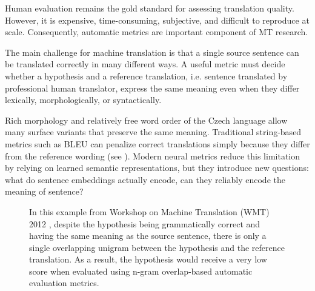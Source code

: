 \documentclass[12pt,a4paper]{report}
\newcommand{\bleu}{\textsc{BLEU}\xspace}
\begin{document}
Human evaluation remains the gold standard for assessing translation quality. However,
it is expensive, time-consuming, subjective, and difficult to reproduce at scale.
Consequently, automatic metrics are important component of MT research. 

The main challenge for machine translation is that a single source sentence can be 
translated correctly in many different ways. A useful metric must decide whether a 
hypothesis and a reference translation, i.e. sentence translated by professional human
translator, express the same meaning even when they differ lexically, morphologically, 
or syntactically.

Rich morphology and relatively free word order of the Czech language allow many surface 
variants that preserve the same meaning. Traditional string-based metrics such as \bleu 
can penalize correct translations simply because they differ from the reference wording 
(see ). Modern neural metrics reduce this limitation 
by relying on learned semantic representations, but they introduce new questions: what 
do sentence embeddings actually encode, can they reliably encode the meaning of sentence?

 \begin{figure}[tb]
\centering
\small
{}
\caption{In this example from  Workshop on Machine Translation (WMT) 2012 \citep{wmt12}, despite the hypothesis being grammatically correct and having the same meaning as the source sentence, there is only a single overlapping unigram between the hypothesis and the reference translation. As a result, the hypothesis would receive a very low score when evaluated using n-gram overlap-based automatic evaluation metrics.}
\label{example_of_BLEU_malfunction}
\end{figure}
\end{document}
